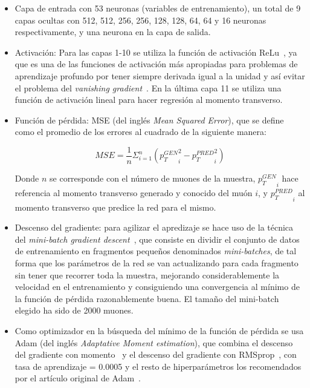 \begin{itemize}

\item Capa de entrada con 53 neuronas (variables de entrenamiento), un total de 9 capas ocultas con 512, 512, 256, 256, 128, 128, 64, 64 y 16 neuronas respectivamente, y una neurona en la capa de salida.

\item Activaci\'on: Para las capas 1-10 se utiliza la funci\'on de activaci\'on ReLu~\cite{agarap2018deep}, ya que es una de las funciones de activaci\'on m\'as apropiadas para problemas de aprendizaje profundo por tener siempre derivada igual a la unidad y as\'i evitar el problema del \textit{vanishing gradient}~\cite{Hochreiter:91}. En la \'ultima capa 11 se utiliza una funci\'on de activaci\'on lineal para hacer regresi\'on al momento transverso.

\item Funci\'on de p\'erdida: MSE (del ingl\'es \textit{Mean Squared Error}), que se define como el promedio de los errores al cuadrado de la siguiente manera:

\begin{equation}
  MSE = \frac{1}{n}\Sigma_{i=1}^{n}{\left({p_{T}^{GEN}}_i^2 - {p_{T}^{PRED}}_i^2\right)}
\label{eq:MSE}
\end{equation}

Donde $n$ se corresponde con el n\'umero de muones de la muestra, ${p_{T}^{GEN}}_i$ hace referencia al momento transverso generado y conocido del mu\'on $i$, y ${p_{T}^{PRED}}_i$ al momento transverso que predice la red para el mismo. 

\item Descenso del gradiente: para agilizar el apredizaje se hace uso de la t\'ecnica del \textit{mini-batch gradient descent}~\cite{perrone2019optimal}, que consiste en dividir el conjunto de datos de entrenamiento en fragmentos peque\~nos denominados \textit{mini-batches}, de tal forma que los par\'ametros de la red se van actualizando para cada fragmento sin tener que recorrer toda la muestra, mejorando considerablemente la velocidad en el entrenamiento y consiguiendo una convergencia al m\'inimo de la funci\'on de p\'erdida razonablemente buena. El tama\~no del mini-batch elegido ha sido de 2000 muones.

\item Como optimizador en la b\'usqueda del m\'inimo de la funci\'on de p\'erdida se usa Adam (del ingl\'es \textit{Adaptative Moment estimation}), que combina el descenso del gradiente con momento~\cite{PMID:12662723} y el descenso del gradiente con RMSprop~\cite{tieleman2012lecture}, con tasa de aprendizaje = 0.0005 y el resto de hiperpar\'ametros los recomendados por el art\'iculo original de Adam~\cite{Kingma2015AdamAM}.


\end{itemize}
